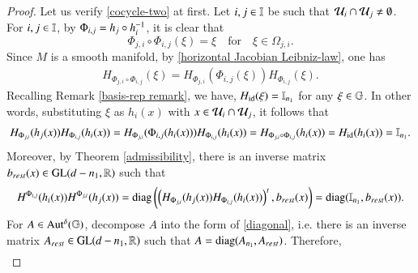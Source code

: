 \documentclass[leqno]{amsart}
\begin{document}
	\begin{proof}
		Let us verify \eqref{cocycle-two} at first. Let $i,j\in\mathbb I$ be such that ${\mathcal U}_{i}\cap{\mathcal U}_{j}\neq\emptyset$. For $i,j\in\mathbb I$, by $\Phi_{i,j}=h_j\circ h_i^{-1}$, it is clear that
		$$\Phi_{j,i}\circ\Phi_{i,j}(\xi)=\xi \quad\mbox{for}\quad\xi\in\Omega_{j,i}.$$
		Since $M$ is a smooth manifold, by \eqref{horizontal Jacobian Leibniz-law}, one has
		\begin{align*}
			H_{\Phi_{j,i}\circ\Phi_{i,j}}(\xi)=H_{\Phi_{j,i}}(\Phi_{i,j}(\xi))H_{\Phi_{i,j}}(\xi).
		\end{align*}
		Recalling Remark \ref{basis-rep remark}, we have, $H_{{\rm id}}(\xi)=\mathbb I_{n_{1}}$ for any $\xi\in\mathbb{G}$. In other words, substituting $\xi$ as $h_{i}(x)$ with $x\in{\mathcal U}_{i}\cap{\mathcal U}_{j}$, it follows that
		\begin{align*}
			H_{\Phi_{j,i}}(h_{j}(x))H_{\Phi_{i,j}}(h_{i}(x))=H_{\Phi_{j,i}}(\Phi_{i,j}(h_{i}(x))) H_{\Phi_{i,j}}(h_{i}(x))
			=H_{\Phi_{j,i}\circ\Phi_{i,j}}(h_{i}(x))=H_{{\rm id}}(h_{i}(x))=\mathbb I_{n_{1}}.
		\end{align*}
		Moreover, by Theorem \ref{admissibility}, there is an inverse matrix $b_{rest}(x)\in{\rm GL}(d-n_{1},\mathbb{R})$ such that
		\begin{align*}
			H^{\Phi_{i,j}}(h_{i}(x))H^{\Phi_{j,i}}(h_{j}(x))
			={\rm diag}\left(\left(H_{\Phi_{j,i}}(h_{j}(x))H_{\Phi_{i,j}}(h_{i}(x))\right)^{t},b_{rest}(x)\right)
			={\rm diag}(\mathbb I_{n_{1}},b_{rest}(x)).
		\end{align*}
		For $A\in{\rm Aut^{\delta}}(\mathbb{G})$, decompose $A$ into the form of \eqref{diagonal}, i.e. there is an inverse matrix $A_{rest}\in{\rm GL}(d-n_{1},\mathbb{R})$ such that
		$A={\rm diag}(A_{n_{1}},A_{rest})$.
		Therefore,
		\begin{align}\label{HH equal I}

\end{align}
\end{proof}
\end{document}
